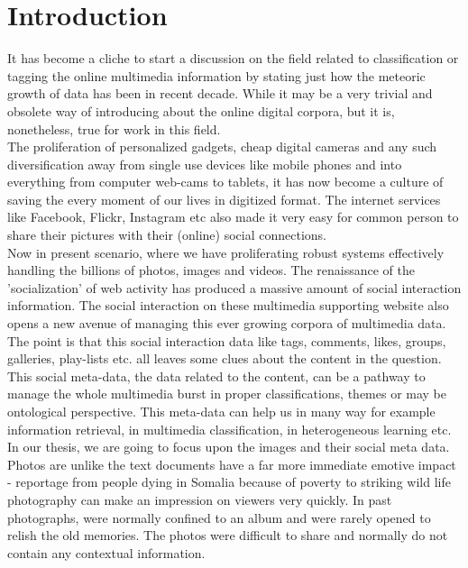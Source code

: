 \chapter{Introduction} %
\label{INTR} %
It has become a cliche to start a discussion on the field related to classification or tagging the online multimedia information by stating just how the meteoric growth of data has been in recent decade. While it may be a very trivial and obsolete way of introducing about the online digital corpora, but it is, nonetheless, true for work in this field.\\
\hspace*{1cm}The proliferation of personalized gadgets, cheap digital cameras and any such diversification away from single use devices like mobile phones and into everything from computer web-cams to tablets, it has now become a culture of saving the every moment of our lives in digitized format. The internet services like Facebook, Flickr, Instagram etc also made it very easy for common person to share their pictures with their (online) social connections.\\
\hspace*{1cm}Now in present scenario, where we have proliferating robust systems effectively handling the billions of photos, images and videos. The renaissance of the 'socialization' of web activity has produced a massive amount of social interaction information. The social interaction on these multimedia supporting website also opens a new avenue of managing this ever growing corpora of multimedia data. The point is that this social interaction data like tags, comments, likes, groups, galleries, play-lists etc. all leaves some clues about the content in the question.\\
\hspace*{1cm}This social meta-data, the data related to the content, can be a pathway to manage the whole multimedia burst in proper classifications, themes  or may be ontological perspective. This meta-data can help us in many way for example information retrieval, in multimedia classification, in heterogeneous learning etc. In our thesis, we are going to focus upon the images and their social meta data.\\
\hspace*{1cm}Photos are unlike the text documents have a far more immediate emotive impact - reportage from people dying in Somalia because of poverty to striking wild life photography can make an impression on viewers very quickly. In past photographs, were normally confined to an album and were rarely opened to relish the old memories. The photos were difficult to share and normally do not contain any contextual information.\\
